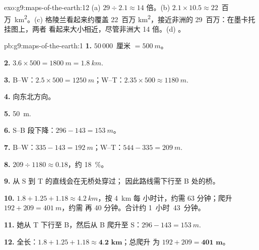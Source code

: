 \begin{solution}{exo:g9:maps-of-the-earth:12}
(a) $29 \div 2.1 \approx 14$ 倍。(b) $2.1 \times 10.5 \approx
22$~百万~\unit{km^2}。(c) 格陵兰看起来约覆盖 22~百万
\unit{km^2}，接近非洲的 29~百万：在墨卡托挂图上，两者
看起来大小相近，尽管非洲大 14 倍。(d)
。
\end{solution}

\begin{solution}{pb:g9:maps-of-the-earth:1}
\textbf{1.} $50\,000$~厘米 $= \qty{500}{m}$。

\textbf{2.} $3.6 \times 500 = \qty{1800}{m} = \qty{1.8}{km}$.

\textbf{3.} B--W：$2.5 \times 500 = \qty{1250}{m}$；W--T：$2.35 \times 500
\approx \qty{1180}{m}$.

\textbf{4.} 向东北方向。

\textbf{5.} \qty{50}{m}.

\textbf{6.} S--B 段下降：$296 - 143 = \qty{153}{m}$。

\textbf{7.} B--W：$335 - 143 = \qty{192}{m}$；W--T：$544 - 335 =
\qty{209}{m}$.

\textbf{8.} $209 \div 1180 \approx 0.18$，约 \qty{18}{\%}。

\textbf{9.} 从 S 到 T 的直线会在无桥处穿过；
因此路线需下行至 B 处的桥。

\textbf{10.} $1.8 + 1.25 + 1.18 \approx \qty{4.2}{km}$，按 \qty{4}{km} 每
小时计，约需 63 分钟；爬升 $192 + 209 = \qty{401}{m}$，约需
再 40 分钟。合计约 1~小时~43~分钟。

\textbf{11.} 她从 T 下行至 B，然后从 B 爬升至 S：$296 -
143 = \qty{153}{m}$.

\textbf{12.} 全长：$1.8 + 1.25 + 1.18 \approx \textbf{4.2 km}$；总爬升
为 $192 + 209 = \textbf{401 m}$。
\end{solution}
